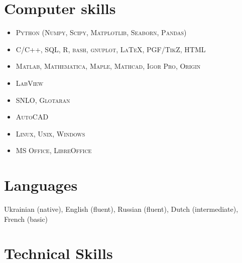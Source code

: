 \documentclass[11pt,letterpaper,sans]{moderncv} %
\begin{document}
\section{Computer skills}
\begin{itemize}
	\item \textsc{Python (Numpy, Scipy, Matplotlib, Seaborn, Pandas)}
	\item \textsc{C/C++, SQL, R, bash, gnuplot, \LaTeX, PGF/TikZ, HTML}
	\item \textsc{Matlab, Mathematica, Maple, Mathcad, Igor Pro, Origin}
	\item \textsc{LabView}
	\item \textsc{SNLO, Glotaran}
	\item \textsc{AutoCAD}
	\item \textsc{Linux, Unix, Windows}
	\item \textsc{MS Office, LibreOffice}
\end{itemize}








\section{Languages}

Ukrainian (native), English (fluent), Russian (fluent), Dutch (intermediate), French (basic)









\section{Technical Skills}
\end{document}
